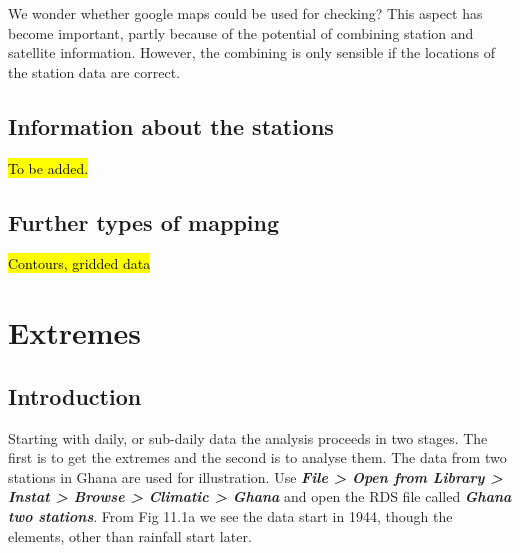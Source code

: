 \documentclass[
  letterpaper,
  DIV=11,
  numbers=noendperiod]{scrreprt}
\begin{document}
We wonder whether google maps could be used for checking? This aspect
has become important, partly because of the potential of combining
station and satellite information. However, the combining is only
sensible if the locations of the station data are correct.

\section{Information about the
stations}\label{information-about-the-stations}

\hl{To be added.}

\section{Further types of mapping}\label{further-types-of-mapping}

\hl{Contours, gridded data}


\chapter{Extremes}\label{extremes}

\section{Introduction}\label{introduction-10}

Starting with daily, or sub-daily data the analysis proceeds in two
stages. The first is to get the extremes and the second is to analyse
them. The data from two stations in Ghana are used for illustration. Use
\textbf{\emph{File \textgreater{} Open from Library \textgreater{}
Instat \textgreater{} Browse \textgreater{} Climatic \textgreater{}
Ghana}} and open the RDS file called \textbf{\emph{Ghana two stations}}.
From Fig 11.1a we see the data start in 1944, though the elements, other
than rainfall start later.
\end{document}
